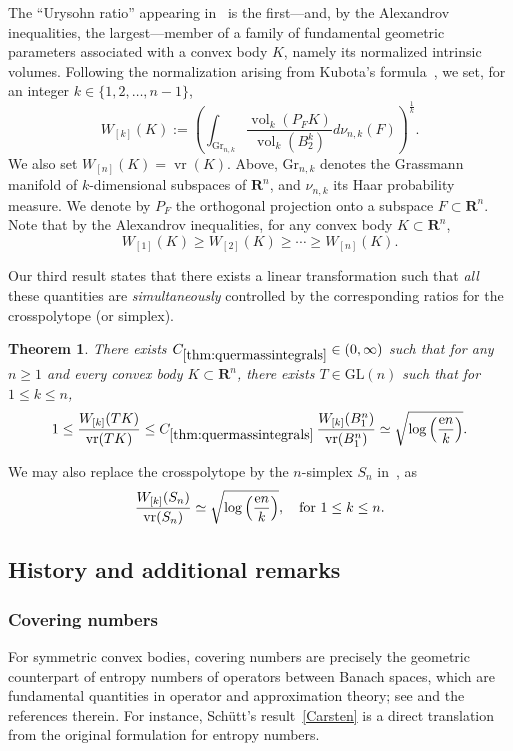 \documentclass[11pt]{amsart}
\newcommand{\R}{\mathbf R}
\newcommand{\Vol}{\operatorname{vol}}
\newcommand{\GL}{\mathrm{GL}}
\newcommand{\Gr}{\mathrm{Gr}}
\newcommand{\vrad}{\operatorname{vr}}
\let\vr\vrad
\newcommand{\1}{\mathbf 1}
\newcommand{\e}{\mathrm{e}}
\let\vol\Vol
\theoremstyle{plain}
\newtheorem{theorem}{Theorem}[section]
\begin{document}
The ``Urysohn ratio'' appearing in~ is the first---and, by the Alexandrov
inequalities, the largest---member of a family of fundamental
geometric parameters associated with a convex body \(K\), namely its
normalized intrinsic volumes. Following the normalization arising from Kubota's
formula~\cite{Sch14}, we set, for an integer $k \in \{1, 2, \dots, n-1\}$,
\begin{equation}
\label{def-W-k}
W_{[k]}(K)
:=
\left(
\int_{\Gr_{n,k}}
\frac{\vol_k(P_F K)}{\vol_k(B_2^k)}
d\nu_{n,k}(F)
\right)^{\frac{1}{k}}.
\end{equation}
We also set $W_{[n]}(K) = \vr(K)$. 
Above, $\Gr_{n,k}$ denotes the Grassmann manifold of $k$-dimensional
subspaces of $\R^n$, and $\nu_{n,k}$ its Haar probability
measure. We denote by $P_F$ the orthogonal projection onto a subspace $F \subset \R^n$. 
Note that by the Alexandrov inequalities, for any convex body $K \subset \R^n$,
\begin{equation}
W_{[1]}(K)\geq W_{[2]}(K)\geq\cdots
\geq W_{[n]}(K).
\end{equation}

Our third result states that there exists a linear transformation such that \emph{all} these quantities are \emph{simultaneously} controlled by
the corresponding ratios for the crosspolytope (or simplex).

\begin{theorem}
\label{thm:quermassintegrals}
There exists $C_{\ref{thm:quermassintegrals}} \in (0, \infty)$ such that for any $n \geq 1$ and every convex body $K \subset \R^n$, there exists $T \in \GL(n)$ such that for $1 \leq k \leq n$,
\begin{equation}
\label{THM3-1}
1 \leq \frac{W_{[k]}(TK)}{{\rm vr}(TK)} \leq C_{\ref{thm:quermassintegrals}} \,
\frac{W_{[k]}(B_1^n)}{ {\rm vr} (B_1^n)} \simeq  \sqrt{\log\left(\frac{\e n}{k}\right)}.
\end{equation}
\end{theorem}
We may also replace the crosspolytope by the $n$-simplex $S_n$ in~, as 
\[
\frac{W_{[k]}(S_n)}{ {\rm vr}(S_n)}
\simeq \sqrt{\log \Big(\frac{\e n}{k}\Big)}, \quad \mbox{for}~1 \leq k \leq n.
\] 
\subsection{History and additional remarks} 

\subsubsection{Covering numbers}
\label{sec:covering-numbers}
For symmetric convex bodies, covering numbers are precisely the geometric counterpart of entropy numbers of operators between Banach spaces, which are fundamental quantities in operator and approximation theory; see \cite{Pin85, CarSte90} and the references therein. For instance, Sch\"utt's result~\eqref{Carsten} is a direct translation from the original formulation for entropy numbers. 
\end{document}
